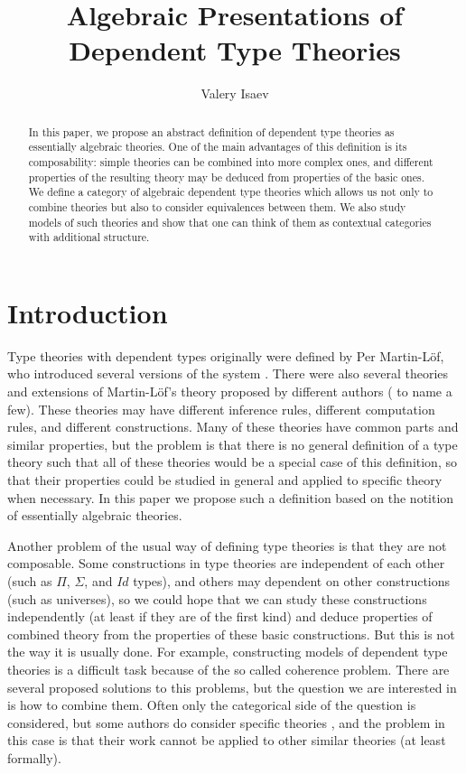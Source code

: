 \documentclass[reqno]{amsart}
\theoremstyle{definition}
\theoremstyle{remark}
\numberwithin{figure}{section}
\begin{document}
\title{Algebraic Presentations of Dependent Type Theories}

\author{Valery Isaev}

\begin{abstract}
In this paper, we propose an abstract definition of dependent type theories as essentially algebraic theories.
One of the main advantages of this definition is its composability: simple theories can be combined into more complex ones,
and different properties of the resulting theory may be deduced from properties of the basic ones.
We define a category of algebraic dependent type theories which allows us not only to combine theories but also to consider equivalences between them.
We also study models of such theories and show that one can think of them as contextual categories with additional structure.
\end{abstract}

\maketitle

 \makeatletter
    \providecommand\@dotsep{5}
  \makeatother

\section{Introduction}

Type theories with dependent types originally were defined by Per Martin-L\"{o}f, who introduced several versions of the system \cite{MLTT72,MLTT73,MLTT79}.
There were also several theories and extensions of Martin-L\"{o}f's theory proposed by different authors (\cite{CoC,luo94} to name a few).
These theories may have different inference rules, different computation rules, and different constructions.
Many of these theories have common parts and similar properties,
but the problem is that there is no general definition of a type theory such that all of these theories would be a special case of this definition,
so that their properties could be studied in general and applied to specific theory when necessary.
In this paper we propose such a definition based on the notition of essentially algebraic theories.

Another problem of the usual way of defining type theories is that they are not composable.
Some constructions in type theories are independent of each other (such as $\Pi$, $\Sigma$, and $Id$ types),
and others may dependent on other constructions (such as universes),
so we could hope that we can study these constructions independently (at least if they are of the first kind)
and deduce properties of combined theory from the properties of these basic constructions.
But this is not the way it is usually done.
For example, constructing models of dependent type theories is a difficult task because of the so called coherence problem.
There are several proposed solutions to this problems, but the question we are interested in is how to combine them.
Often only the categorical side of the question is considered,
but some authors do consider specific theories \cite{streicher,pitts},
and the problem in this case is that their work cannot be applied to other similar theories (at least formally).
\end{document}
